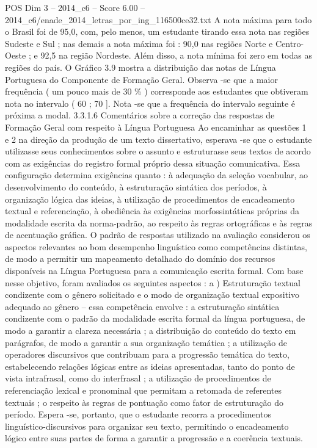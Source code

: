 \begin{textsample}{POS Dim 3 – 2014\_c6 – Score 6.00 – 2014\_c6/enade\_2014\_letras\_por\_ing\_116500ce32.txt}
A nota máxima para todo o Brasil foi de 95,0, com, pelo menos, um estudante tirando essa nota nas regiões Sudeste e Sul ; nas demais a nota máxima foi : 90,0 nas regiões Norte e Centro-Oeste ; e 92,5 na região Nordeste.
Além disso, a nota mínima foi zero em todas as regiões do país.
O Gráfico 3.9 mostra a distribuição das notas de Língua Portuguesa do Componente de Formação Geral.
Observa -se que a maior frequência ( um pouco mais de 30 \% ) corresponde aos estudantes que obtiveram nota no intervalo ( 60 ; 70 ].
Nota -se que a frequência do intervalo seguinte é próxima a modal. 3.3.1.6 Comentários sobre a correção das respostas de Formação Geral com respeito à Língua Portuguesa Ao encaminhar as questões 1 e 2 na direção da produção de um texto dissertativo, esperava -se que o estudante utilizasse seus conhecimentos sobre o assunto e estruturasse seus textos de acordo com as exigências do registro formal próprio dessa situação comunicativa.
Essa configuração determina exigências quanto : à adequação da seleção vocabular, ao desenvolvimento do conteúdo, à estruturação sintática dos períodos, à organização lógica das ideias, à utilização de procedimentos de encadeamento textual e referenciação, à obediência às exigências morfossintáticas próprias da modalidade escrita da norma-padrão, ao respeito às regras ortográficas e às regras de acentuação gráfica.
O padrão de respostas utilizado na avaliação considerou os aspectos relevantes ao bom desempenho linguístico como competências distintas, de modo a permitir um mapeamento detalhado do domínio dos recursos disponíveis na Língua Portuguesa para a comunicação escrita formal.
Com base nesse objetivo, foram avaliados os seguintes aspectos : a ) Estruturação textual condizente com o gênero solicitado e o modo de organização textual expositivo adequado ao gênero – essa competência envolve : a estruturação sintática condizente com o padrão da modalidade escrita formal da língua portuguesa, de modo a garantir a clareza necessária ; a distribuição do conteúdo do texto em parágrafos, de modo a garantir a sua organização temática ; a utilização de operadores discursivos que contribuam para a progressão temática do texto, estabelecendo relações lógicas entre as ideias apresentadas, tanto do ponto de vista intrafrasal, como do interfrasal ; a utilização de procedimentos de referenciação lexical e pronominal que permitam a retomada de referentes textuais ; o respeito às regras de pontuação como fator de estruturação do período.
Espera -se, portanto, que o estudante recorra a procedimentos linguístico-discursivos para organizar seu texto, permitindo o encadeamento lógico entre suas partes de forma a garantir a progressão e a coerência textuais.

\end{textsample}
